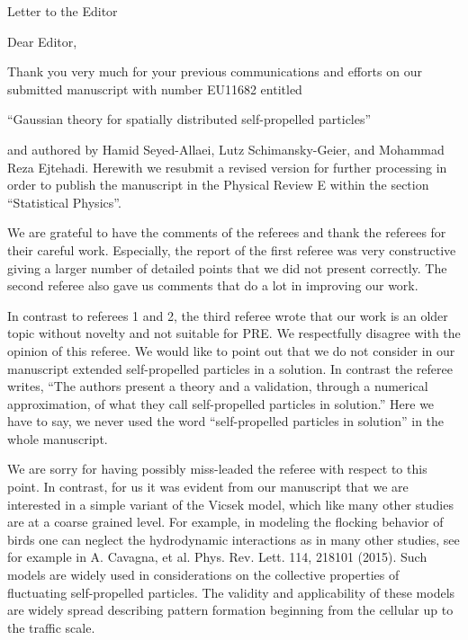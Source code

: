 \documentclass[a4paper,11pt]{letter}
\begin{document}
\longindentation=0pt

\signature{Hamid Seyed-Allaei (in the name of the co-autors)}
\address{Sharif University of Technology \\ Azadi Avenue \\ Tehran, Iran}

\date{\today}


\begin{letter}{Letter to the Editor}


\opening{Dear Editor,}

Thank you very much for your previous communications and efforts on our submitted manuscript with number EU11682 entitled

``Gaussian theory for spatially distributed self-propelled particles''

and authored by Hamid Seyed-Allaei, Lutz Schimansky-Geier, and Mohammad Reza Ejtehadi. Herewith we resubmit a revised version for further processing in order to publish the manuscript in the Physical Review E within the section ``Statistical Physics''.

We are grateful to have the comments of the referees and thank the referees for their careful work. Especially, the report of the first referee was very constructive giving a larger number of detailed points that we did not present correctly. The second referee also gave us comments that do a lot in improving our work.

In contrast to referees 1 and 2, the third referee wrote that our work is an older topic without novelty and not suitable for PRE. We respectfully disagree with the opinion of this referee. We would like to point out that we do not consider in our manuscript extended self-propelled particles in a solution. In contrast the referee writes, ``The authors present a theory and a validation, through a numerical approximation, of what they call self-propelled particles in solution.'' Here we have to say, we never used the word ``self-propelled particles in solution'' in the whole manuscript.

We are sorry for having possibly miss-leaded the referee with respect to this point. In contrast, for us it was evident from our manuscript that we are interested in a simple variant of the Vicsek model, which like many other studies are at a coarse grained level. For example, in modeling the flocking behavior of birds one can neglect the hydrodynamic interactions as in many other studies, see for example in A. Cavagna, et al. Phys. Rev. Lett. 114, 218101 (2015). Such models are widely used in considerations on the collective properties of fluctuating self-propelled particles. The validity and applicability of these models are widely spread describing pattern formation beginning from the cellular up to the traffic scale.


\end{letter}
\end{document}
